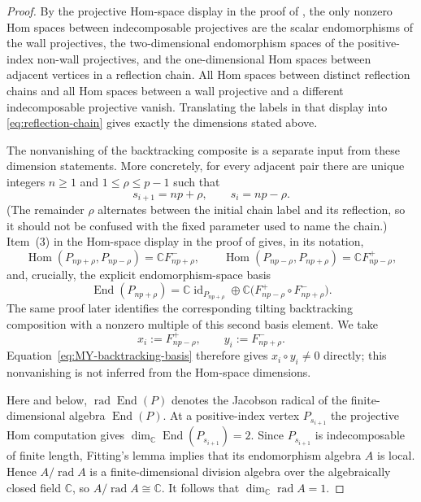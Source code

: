 \documentclass[12pt,leqno]{amsart}
\numberwithin{equation}{section}
\newcommand{\End}{\operatorname{End}}
\newcommand{\Hom}{\operatorname{Hom}}
\newcommand{\rad}{\operatorname{rad}}
\newcommand{\id}{\operatorname{id}}
\def\C{\mathbb{C}}
\begin{document}
\begin{proof}
By the projective Hom-space display in the proof of
\cite[Theorem~6.6]{McRaeYang}, the only nonzero Hom spaces between
indecomposable projectives are the scalar endomorphisms of the wall
projectives, the two-dimensional endomorphism spaces of the positive-index
non-wall projectives, and the one-dimensional Hom spaces between adjacent
vertices in a reflection chain.  All Hom spaces between distinct reflection
chains and all Hom spaces between a wall projective and a different
indecomposable projective vanish.  Translating the labels in that display
into \eqref{eq:reflection-chain} gives exactly the dimensions stated above.

The nonvanishing of the backtracking composite is a separate input from
these dimension statements.  More concretely, for every adjacent pair
there are unique integers $n\ge1$ and $1\le\rho\le p-1$ such that
\[
 s_{i+1}=np+\rho,\qquad s_i=np-\rho.
\]
(The remainder $\rho$ alternates between the initial chain label and its
reflection, so it should not be confused with the fixed parameter used to
name the chain.)  Item~(3) in the Hom-space display in the proof of
\cite[Theorem~6.6]{McRaeYang} gives, in its notation,
\[
 \Hom(P_{np+\rho},P_{np-\rho})=\C F^-_{np+\rho},\qquad
 \Hom(P_{np-\rho},P_{np+\rho})=\C F^+_{np-\rho},
\]
and, crucially, the explicit endomorphism-space basis
\begin{equation}\label{eq:MY-backtracking-basis}
 \End(P_{np+\rho})
 =\C\id_{P_{np+\rho}}
  \oplus
  \C\bigl(F^+_{np-\rho}\circ F^-_{np+\rho}\bigr).
\end{equation}
The same proof later identifies the corresponding tilting backtracking
composition with a nonzero multiple of this second basis element.  We take
\[
 x_i:=F^+_{np-\rho},\qquad y_i:=F^-_{np+\rho}.
\]
Equation~\eqref{eq:MY-backtracking-basis} therefore gives
$x_i\circ y_i\ne0$ directly; this nonvanishing is not inferred from the
Hom-space dimensions.

Here and below, $\rad\End(P)$ denotes the Jacobson radical of the
finite-dimensional algebra $\End(P)$.  At a positive-index vertex
$P_{s_{i+1}}$ the projective Hom computation gives
$\dim_\C\End(P_{s_{i+1}})=2$.  Since $P_{s_{i+1}}$ is indecomposable of
finite length, Fitting's lemma implies that its endomorphism algebra $A$ is
local.  Hence $A/\rad A$ is a finite-dimensional division algebra over the
algebraically closed field $\C$, so $A/\rad A\cong\C$.  It follows that
$\dim_\C\rad A=1$.


\end{proof}
\end{document}
